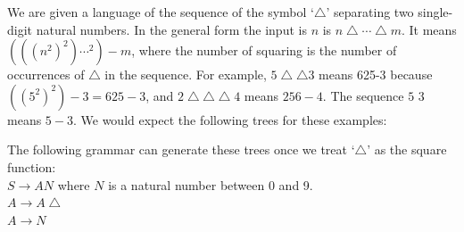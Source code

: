 \documentclass[12pt,a4paper]{article}
\begin{document}
\noindent We are given a language of the sequence of the symbol `$ \bigtriangleup $' separating two single-digit natural numbers. In the general form the input is $n$ is $n\bigtriangleup \cdots \bigtriangleup m $. It means $(((n^{2})^{2})\cdots^{2})-m$, where the number of squaring is the number of occurrences of $\bigtriangleup$ in the sequence. For example, $5\bigtriangleup\bigtriangleup3$ means 625-3 because $((5^{2})^{2})-3=625-3$, and $2\bigtriangleup\bigtriangleup\bigtriangleup4$ means $256-4$. The sequence $5$ $3$ means $5-3$. We would expect the following trees for these examples:\\

\hspace{1cm}
\hspace{2cm}
\hspace{2cm}

\noindent The following grammar can generate these trees once we treat `$\bigtriangleup$' as the square function:\\

$S\rightarrow AN$ where $N$ is a natural number between 0 and 9.\\	
\indent $A\rightarrow A\bigtriangleup$\\
\indent $A\rightarrow N$\\
\end{document}
